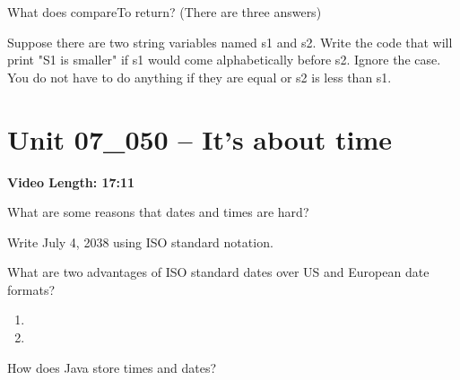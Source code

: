 \documentclass[letterpaper,12pt]{exam}
\newcommand{\unit}{Unit 07}
\begin{document}
\begin{questions}
\begin{samepage}
    \question What does compareTo return?  (There are three answers)
    \vspace{5mm}
\end{samepage}

\begin{samepage}
    \question Suppose there are two string variables named s1 and s2.  Write the code that will print "S1 is smaller" if s1 would come alphabetically before s2.   Ignore the case.  You do not have to do anything if they are equal or s2 is less than s1.
    \vspace{5mm}
\end{samepage}


\section*{\unit\_050 -- It's about time} %
\noindent \textbf{Video Length: 17:11}

\begin{samepage}
    \question What are some reasons that dates and times are hard?
    \vspace{25mm}
\end{samepage}

\begin{samepage}
    \question Write July 4, 2038 using ISO standard notation.
    \vspace{5mm}
\end{samepage}

\begin{samepage}
    \question What are two advantages of ISO standard dates over US and European date formats?
      \begin{enumerate}
        \vspace{5mm}
        \item 
        \vspace{5mm}
        \item 
        \vspace{5mm}
       \end{enumerate}
\end{samepage}


\begin{samepage}
    \question How does Java store times and dates?
    \vspace{5mm}
\end{samepage}


\end{questions}
\end{document}
